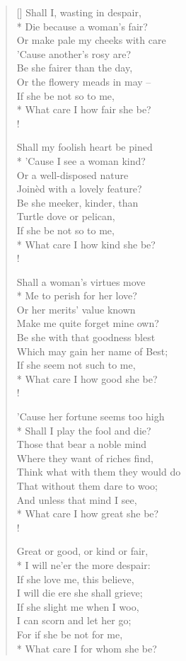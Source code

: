 \documentclass[MAIN]{subfiles}
\begin{document}
\settowidth{\versewidth}{Shall I, wasting in despair,}
\begin{verse}[\versewidth]
Shall I, wasting in despair,\\*
Die because a woman's fair?\\
Or make pale my cheeks with care\\
'Cause another's rosy are?\\
Be she fairer than the day,\\
Or the flowery meads in may --\\
\vin If she be not so to me,\\*
\vin What care I how fair she be?\\!

Shall my foolish heart be pined\\*
'Cause I see a woman kind?\\
Or a well-disposed nature\\
Join\`ed with a lovely feature?\\
Be she meeker, kinder, than\\
Turtle dove or pelican,\\
\vin If she be not so to me,\\*
\vin What care I how kind she be?\\!

Shall a woman's virtues move\\*
Me to perish for her love?\\
Or her merits' value known\\
Make me quite forget mine own?\\
Be she with that goodness blest\\
Which may gain her name of Best;\\
\vin If she seem not such to me,\\*
\vin What care I how good she be?\\!

'Cause her fortune seems too high\\*
Shall I play the fool and die?\\
Those that bear a noble mind\\
Where they want of riches find,\\
Think what with them they would do\\
That without them dare to woo;\\
\vin And unless that mind I see,\\*
\vin What care I how great she be?\\!

Great or good, or kind or fair,\\*
I will ne'er the more despair:\\
If she love me, this believe,\\
I will die ere she shall grieve;\\
If she slight me when I woo,\\
I can scorn and let her go;\\
\vin For if she be not for me,\\*
\vin What care I for whom she be?
\end{verse}
\end{document}
